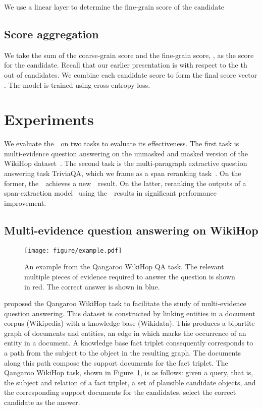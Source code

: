 \documentclass{article} \usepackage{iclr2019_conference,times}
\begin{document}
We use a linear layer to determine the fine-grain score of the candidate




\subsection{Score aggregation}

We take the sum of the coarse-grain score and the fine-grain score, , as the score for the candidate.
Recall that our earlier presentation is with respect to the th out of  candidates.
We combine each candidate score to form the final score vector .
The model is trained using cross-entropy loss.


\section{Experiments}
We evaluate the~\modelnameshort~on two tasks to evaluate its effectiveness.
The first task is multi-evidence question answering on the unmasked and masked version of the WikiHop dataset~\citep{welbl2018constructing}.
The second task is the multi-paragraph extractive question answering task TriviaQA, which we frame as a span reranking task~\citep{Joshi2017TriviaQA}.
On the former, the~\modelnameshort~achieves a new~\sota~result.
On the latter, reranking the outputs of a span-extraction model~\citep{clark2018simple} using the~\modelnameshort~results in significant performance improvement.


\subsection{Multi-evidence question answering on WikiHop}

\begin{figure}[t]
    \centering
    \texttt{[image: figure/example.pdf]}
    \caption{
    An example from the Qangaroo WikiHop QA task.
    The relevant multiple pieces of evidence required to answer the question is shown in red.
    The correct answer is shown in blue.
    }
    \label{fig:example}
    \vspace{-0.5cm}
\end{figure}


\citet{welbl2018constructing} proposed the Qangaroo WikiHop task to facilitate the study of multi-evidence question answering.
This dataset is constructed by linking entities in a document corpus (Wikipedia) with a knowledge base (Wikidata).
This produces a bipartite graph of documents and entities, an edge in which marks the occurrence of an entity in a document.
A knowledge base fact triplet consequently corresponds to a path from the subject to the object in the resulting graph.
The documents along this path compose the support documents for the fact triplet.
The Qangaroo WikiHop task, shown in Figure~\ref{fig:example}, is as follows:
given a query, that is, the subject and relation of a fact triplet, a set of plausible candidate objects, and the corresponding support documents for the candidates, select the correct candidate as the answer.
\end{document}
